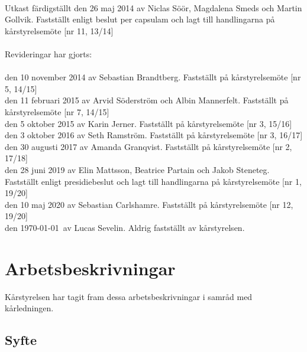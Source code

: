 
\newcommand{\sectionbreak}{\clearpage}


%
%
\vspace*{9 cm}
\noindent
{\huge{}}\\

\vspace{0.2cm}
\noindent
Utkast färdigställt den 26 maj 2014 av Niclas Söör, Magdalena Smeds och
Martin Gollvik. Fastställt enligt beslut per capsulam och lagt till
handlingarna på kårstyrelsemöte {[}nr 11, 13/14{]} \\ \\
Revideringar har gjorts:\\ \\
  den 10 november 2014 av Sebastian Brandtberg. Fastställt på
  kårstyrelsemöte {[}nr 5, 14/15{]} \\
  den 11 februari 2015 av Arvid Söderström och Albin Mannerfelt.
  Fastställt på kårstyrelsemöte {[}nr 7, 14/15{]} \\
  den 5 oktober 2015 av Karin Jerner. Fastställt på kårstyrelsemöte
  {[}nr 3, 15/16{]} \\
  den 3 oktober 2016 av Seth Ramström. Fastställt på kårstyrelsemöte
  {[}nr 3, 16/17{]} \\
  den 30 augusti 2017 av Amanda Granqvist. Fastställt på kårstyrelsemöte
  {[}nr 2, 17/18{]} \\
  den 28 juni 2019 av Elin Mattsson, Beatrice Partain och Jakob
  Steneteg. Fastställt enligt presidiebeslut och lagt till handlingarna
  på kårstyrelsemöte {[}nr 1, 19/20{]} \\
  den 10 maj 2020 av Sebastian Carlshamre. Fastställt på kårstyrelsemöte
  {[}nr 12, 19/20{]} \\
  den \today \ av Lucas Sevelin. Aldrig fastställt av kårstyrelsen.

%
%
\vspace*{1 mm}
\tableofcontents

\hypertarget{arbetsbeskrivningar}{%
\section{Arbetsbeskrivningar}\label{arbetsbeskrivningar}}

Kårstyrelsen har tagit fram dessa arbetsbeskrivningar i samråd med
kårledningen.

\hypertarget{syfte}{%
\subsection{Syfte}\label{syfte}}

